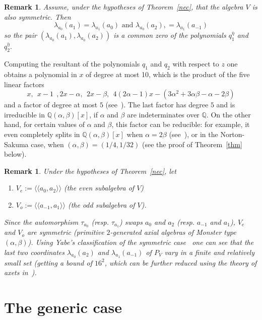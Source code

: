 \documentclass[a4paper]{amsart}
\newtheorem{remark}[lemma]{Remark}
\newcommand{\Q}{{\mathbb Q}}
\newcommand{\al}{\alpha}
\newcommand{\bt}{\beta}
\begin{document}
\begin{remark}\label{casosimmetrico}
Assume, under the hypotheses of Theorem~\ref{nec}, that the algebra $V$ is also symmetric. Then 
$$\lambda_{ a_0}(a_1)= \lambda_{a_1}(a_0) \mbox{ and } 
\lambda_{a_0}(a_2),=\lambda_{a_1}(a_{-1})
$$
so the pair $ (\lambda_{a_0}(a_1), \lambda_{a_0}(a_2))$ is a common zero of the polynomials $
q_1^{\bar \eta}$ and $q_2^{\bar \eta}.
$
\end{remark}
Computing the resultant of the polynomials $q_1$ and 
$q_2$ with respect to $z$ one obtains a polynomial in $x$ of degree at most 10, which is the product of the five linear factors
$$
x,\:\: x-1\:\:, 2x-\al, \:\: 2x-\bt, \:\:4(2\al-1)x-(3\al^2+3\al\bt-\al-2\bt)
$$
and a factor of degree at most $5$ (see~\cite[genericsakuma.s]{code}).  
The last factor has degree $5$ and is irreducible in $\Q(\al, \bt)[x]$, if $\al$ and $ \bt$ are indeterminates over $\Q$. On the other hand, for certain values of $\alpha$ and $\beta$, this factor can be reducible: for example, it even completely splits in $\Q(\al, \bt)[x]$ when $\al=2\bt$ (see~\cite{FMS2}), or in the Norton-Sakuma case, when $(\al, \bt)=(1/4, 1/32)$ (see the proof of Theorem~\ref{thm} below). 

\begin{remark}\label{evenodd}
Under the hypotheses of Theorem~\ref{nec},  let 
\begin{enumerate}
\item []  $V_e:=\langle \langle a_0, a_2\rangle \rangle$ (the {\it even subalgebra} of $V$) 
\item [] $V_o:=\langle \langle  a_{-1}, a_1\rangle \rangle$ (the {\it odd  subalgebra} of $V$). 
\end{enumerate}
Since the automorphism  $\tau_{a_0}$ (resp. $\tau_{a_1}$) swaps $a_0$ and $a_2$ (resp. $a_{-1}$ and $a_1$),  $V_e$ and $V_o$ are symmetric (primitive $2$-generated axial algebras of Monster type $(\al, \bt)$). Using Yabe's classification of the symmetric case~\cite[Theorem~2]{Yabe} one can see that the last two coordinates $
\lambda_{a_0}(a_2)$ and $\lambda_{a_1}(a_{-1})
$ of $P_V$ vary in a finite and relatively small set (getting a bound of $16^2$, which can be further reduced using the theory of axets in~\cite{axet}). 
\end{remark}

\section{The generic case}\label{truegeneric}
\end{document}
